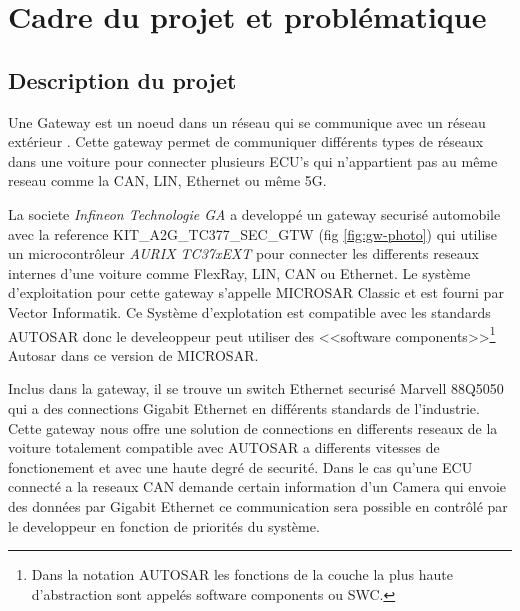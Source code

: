 \section{Cadre du projet et probl\'ematique}

\subsection{Description du projet}

Une Gateway est un noeud dans un réseau qui se communique avec un réseau extérieur \cite{gateway-definition}. Cette gateway permet de communiquer différents types de réseaux dans une voiture pour connecter plusieurs ECU's qui n'appartient pas au même reseau comme la CAN, LIN, Ethernet ou m\^eme 5G. 

La societe \textit{Infineon Technologie GA} a developp\'e un gateway securis\'e automobile avec la reference KIT\_A2G\_TC377\_SEC\_GTW \cite{gateway} (fig \ref{fig:gw-photo}) qui utilise un microcontr\^oleur \textit{AURIX TC37xEXT} pour connecter les differents reseaux internes d'une voiture comme FlexRay, LIN, CAN ou Ethernet. Le syst\`eme d'exploitation pour cette gateway s'appelle MICROSAR Classic \cite{vector.microsar} et est fourni par Vector Informatik. Ce Syst\`eme d'explotation est compatible avec les standards AUTOSAR donc le develeoppeur peut utiliser des <<software components>>\footnote{Dans la notation AUTOSAR les fonctions de la couche la plus haute d'abstraction sont appel\'es software components ou SWC.} Autosar dans ce version de MICROSAR.

Inclus dans la gateway, il se trouve un switch Ethernet securis\'e Marvell 88Q5050 qui a des connections Gigabit Ethernet en différents standards de l'industrie. Cette gateway nous offre une solution de connections en differents reseaux de la voiture totalement compatible avec AUTOSAR a differents vitesses de fonctionement et avec une haute degré de securit\'e. Dans le cas qu'une ECU connect\'e a la reseaux CAN demande certain information d'un Camera qui envoie des donn\'ees par Gigabit Ethernet ce communication sera possible en contr\^ol\'e par le developpeur en fonction de priorit\'es du syst\`eme.


